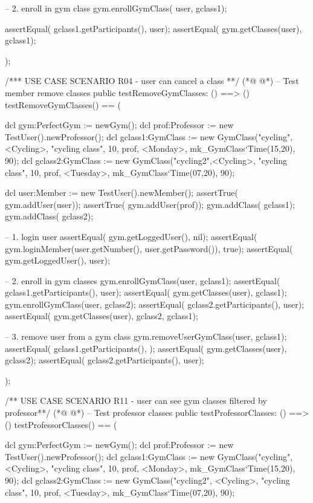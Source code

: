 \begin{vdmpp}[breaklines=true]
  -- 2. enroll in gym class
  gym.enrollGymClass( user, gclass1);
  
  assertEqual( gclass1.getParticipants(), {user});
  assertEqual( gym.getClasses(user), {gclass1});
 
 );
 
 /*** USE CASE SCENARIO R04 - user can cancel a class **/
(*@
\label{testRemoveGymClasses:309}
@*)
 -- Test member remove classes
 public testRemoveGymClasses: () ==> ()
 testRemoveGymClasses() == (
 
   dcl gym:PerfectGym := newGym();
  dcl prof:Professor := new TestUser().newProfessor();
  dcl gclass1:GymClass := new GymClass("cycling", <Cycling>, "cycling class", 10, prof, <Monday>, mk_GymClass`Time(15,20), 90);
  dcl gclass2:GymClass := new GymClass("cycling2",<Cycling>, "cycling class", 10, prof, <Tuesday>, mk_GymClass`Time(07,20), 90);
  
  dcl user:Member := new TestUser().newMember(); 
  assertTrue( gym.addUser(user));
  assertTrue( gym.addUser(prof));
  gym.addClass( gclass1); 
  gym.addClass( gclass2);
  
  
  -- 1. login user
  assertEqual( gym.getLoggedUser(), nil); 
  assertEqual( gym.loginMember(user.getNumber(), user.getPassword()), true);
  assertEqual( gym.getLoggedUser(), user);
  
  -- 2. enroll in gym classes
  gym.enrollGymClass(user, gclass1);
  assertEqual( gclass1.getParticipants(), {user});
  assertEqual( gym.getClasses(user), {gclass1});
  gym.enrollGymClass(user, gclass2);
  assertEqual( gclass2.getParticipants(), {user});
  assertEqual( gym.getClasses(user), {gclass2, gclass1});
 
   -- 3. remove user from a gym class
   gym.removeUserGymClass(user, gclass1);
   assertEqual( gclass1.getParticipants(), {});
   assertEqual( gym.getClasses(user), {gclass2});
   assertEqual( gclass2.getParticipants(), {user});
   
 );
 
 /** USE CASE SCENARIO R11 - user can see gym classes filtered by professor**/
(*@
\label{testProfessorClasses:347}
@*)
 -- Test professor classes
 public testProfessorClasses: () ==> ()
 testProfessorClasses() == (
 
   dcl gym:PerfectGym := newGym();
  dcl prof:Professor := new TestUser().newProfessor();
  dcl gclass1:GymClass := new GymClass("cycling", <Cycling>, "cycling class", 10, prof, <Monday>, mk_GymClass`Time(15,20), 90);
  dcl gclass2:GymClass := new GymClass("cycling2", <Cycling>, "cycling class", 10, prof, <Tuesday>, mk_GymClass`Time(07,20), 90);
 

\end{vdmpp}

